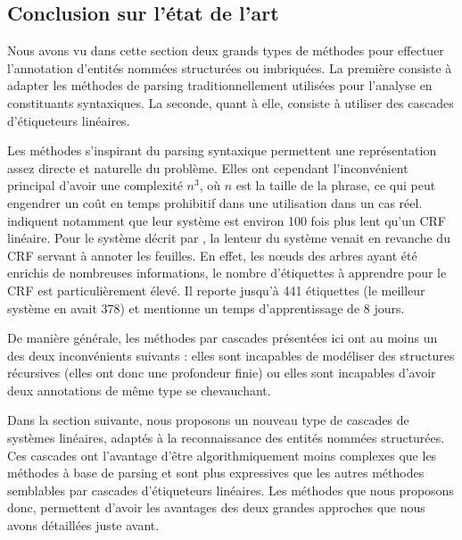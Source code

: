 \documentclass[12pt,a4paper,times,twoside,openright]{report}
\begin{document}
        \subsection{Conclusion sur l'état de l'art}
Nous avons vu dans cette section deux grands types de méthodes pour effectuer l'annotation d'entités nommées structurées ou imbriquées. La première consiste à adapter les méthodes de parsing traditionnellement utilisées pour l'analyse en constituants syntaxiques. La seconde, quant à elle, consiste à utiliser des cascades d'étiqueteurs linéaires.

Les méthodes s'inspirant du parsing syntaxique permettent une représentation assez directe et naturelle du problème. Elles ont cependant l'inconvénient principal d'avoir une complexité $n^{3}$, où $n$ est la taille de la phrase, ce qui peut engendrer un coût en temps prohibitif dans une utilisation dans un cas réel. \citet{finkel2009b} indiquent notamment que leur système est environ 100 fois plus lent qu'un CRF linéaire. Pour le système décrit par \citet{dinarelli2012}, la lenteur du système venait en revanche du CRF servant à annoter les feuilles. En effet, les n\oe uds des arbres ayant été enrichis de nombreuses informations, le nombre d'étiquettes à apprendre pour le CRF est particulièrement élevé. Il reporte jusqu'à 441 étiquettes (le meilleur système en avait 378) et mentionne un temps d'apprentissage de 8 jours.

De manière générale, les méthodes par cascades présentées ici ont au moins un des deux inconvénients suivants : elles sont incapables de modéliser des structures récursives (elles ont donc une profondeur finie) ou elles sont incapables d'avoir deux annotations de même type se chevauchant.

Dans la section suivante, nous proposons un nouveau type de cascades de systèmes linéaires, adaptés à la reconnaissance des entités nommées structurées. Ces cascades ont l'avantage d'être algorithmiquement moins complexes que les méthodes à base de parsing et sont plus expressives que les autres méthodes semblables par cascades d'étiqueteurs linéaires. Les méthodes que nous proposons donc, permettent d'avoir les avantages des deux grandes approches que nous avons détaillées juste avant.



    
\end{document}
